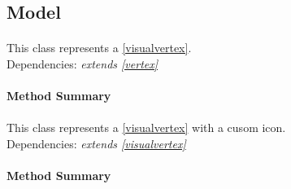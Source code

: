 \subsection{Model}
\paragraph*{}
\paragraph*{}
This class represents a \ref{visualvertex}. \\
Dependencies: \textit{extends \ref{vertex}}
\paragraph*{Method Summary}
\paragraph*{}

\paragraph*{}
\paragraph*{}
This class represents a \ref{visualvertex} with a cusom icon.\\
Dependencies: \textit{extends \ref{visualvertex}}
\paragraph*{Method Summary}
